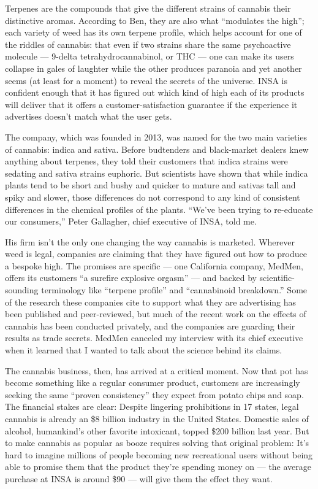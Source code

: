 Terpenes are the compounds that give the different strains of cannabis
their distinctive aromas. According to Ben, they are also what
``modulates the high''; each variety of weed has its own terpene
profile, which helps account for one of the riddles of cannabis: that
even if two strains share the same psychoactive molecule --- 9-delta
tetrahydrocannabinol, or THC --- one can make its users collapse in
gales of laughter while the other produces paranoia and yet another
seems (at least for a moment) to reveal the secrets of the universe.
INSA is confident enough that it has figured out which kind of high each
of its products will deliver that it offers a customer-satisfaction
guarantee if the experience it advertises doesn't match what the user
gets.

The company, which was founded in 2013, was named for the two main
varieties of cannabis: indica and sativa. Before budtenders and
black-market dealers knew anything about terpenes, they told their
customers that indica strains were sedating and sativa strains euphoric.
But scientists have shown that while indica plants tend to be short and
bushy and quicker to mature and sativas tall and spiky and slower, those
differences do not correspond to any kind of consistent differences in
the chemical profiles of the plants. ``We've been trying to re-educate
our consumers,'' Peter Gallagher, chief executive of INSA, told me.

His firm isn't the only one changing the way cannabis is marketed.
Wherever weed is legal, companies are claiming that they have figured
out how to produce a bespoke high. The promises are specific --- one
California company, MedMen, offers its customers ``a surefire explosive
orgasm'' --- and backed by scientific-sounding terminology like
``terpene profile'' and ``cannabinoid breakdown.'' Some of the research
these companies cite to support what they are advertising has been
published and peer-reviewed, but much of the recent work on the effects
of cannabis has been conducted privately, and the companies are guarding
their results as trade secrets. MedMen canceled my interview with its
chief executive when it learned that I wanted to talk about the science
behind its claims.

The cannabis business, then, has arrived at a critical moment. Now that
pot has become something like a regular consumer product, customers are
increasingly seeking the same ``proven consistency'' they expect from
potato chips and soap. The financial stakes are clear: Despite lingering
prohibitions in 17 states, legal cannabis is already an \$8 billion
industry in the United States. Domestic sales of alcohol, humankind's
other favorite intoxicant, topped \$200 billion last year. But to make
cannabis as popular as booze requires solving that original problem:
It's hard to imagine millions of people becoming new recreational users
without being able to promise them that the product they're spending
money on --- the average purchase at INSA is around \$90 --- will give
them the effect they want.

